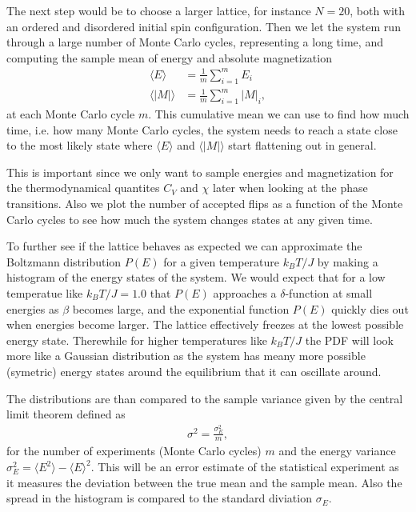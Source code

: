 \documentclass[twocolumn]{aastex62}
\begin{document}
The next step would be to choose a larger lattice, for instance $N = 20$, both
with an ordered and disordered initial spin configuration. Then we let the
system run through a large number of Monte Carlo cycles, representing a long
time, and computing the sample mean of energy and absolute magnetization
\begin{align}
	\langle E\rangle &= \frac{1}{m}\sum_{i = 1}^m E_i\\
	\langle |M|\rangle &= \frac{1}{m}\sum_{i = 1}^m |M|_i,
\end{align} 
at each Monte Carlo cycle $m$. This cumulative mean we can use to find how much
time, i.e. how many Monte Carlo cycles, the system needs to reach a state close
to the most likely state where $\langle E \rangle$ and $\langle |M|\rangle$
start flattening out in general.

This is important since we only want to sample energies and magnetization for
the thermodynamical quantites $C_V$ and $\chi$ later when looking at the phase
transitions. 
Also we plot the number of accepted flips as a function of the Monte Carlo
cycles to see how much the system changes states at any given time.

To further see if the lattice behaves as expected we can approximate the
Boltzmann distribution $P(E)$ for a given temperature $k_BT/J$ by making a
histogram of the energy states of the system. We would expect that for a low
temperatue like $k_BT / J = 1.0$ that $P(E)$ approaches a $\delta$-function at
small energies as
$\beta$ becomes large, and the exponential function $P(E)$ quickly dies out when
energies become larger. The lattice effectively freezes at the lowest possible
energy state. Therewhile for higher temperatures like $k_BT/J$ the PDF
will look more like a Gaussian distribution as the system has meany more
possible (symetric) energy states around the equilibrium that it can oscillate
around. 

The distributions are than compared to the sample variance given by the central
limit theorem \citep[p. 357]{jensen:2015} defined as 
\begin{align}
	\sigma^2 = \frac{\sigma^2_E}{m},
\end{align}
for the number of experiments (Monte Carlo cycles) $m$ and the energy variance
$\sigma_E^2 = \langle E^2\rangle - \langle E \rangle^2$. This will be an error
estimate of the statistical experiment as it measures the deviation between the
true mean and the sample mean. Also the spread in the histogram is compared to
the standard diviation $\sigma_E$.
\end{document}
